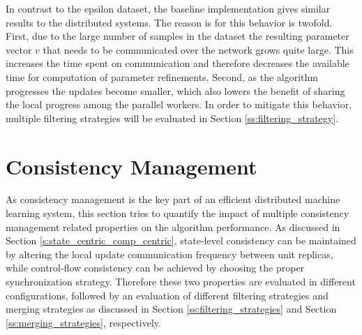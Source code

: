 In contrast to the epsilon dataset, the baseline implementation gives similar results to the distributed systems.
The reason is for this behavior is twofold.
First, due to the large number of samples in the dataset the resulting parameter vector $v$ that needs to be communicated over the network grows quite large.
This increases the time spent on communication and therefore decreases the available time for computation of parameter refinements.
Second, as the algorithm progresses the updates become smaller, which also lowers the benefit of sharing the local progress among the parallel workers.
In order to mitigate this behavior, multiple filtering strategies will be evaluated in Section \ref{ss:filtering_strategy}.

\section{Consistency Management}
As consistency management is the key part of an efficient distributed machine learning system, this section tries to quantify the impact of multiple consistency management related properties on the algorithm performance.
As discussed in Section \ref{s:state_centric_comp_centric}, state-level consistency can be maintained by altering the local update communication frequency between unit replicas, while control-flow consistency can be achieved by choosing the proper synchronization strategy.
Therefore these two properties are evaluated in different configurations, followed by an evaluation of different filtering strategies and merging strategies as discussed in Section \ref{ss:filtering_strategies} and Section \ref{ss:merging_strategies}, respectively.

